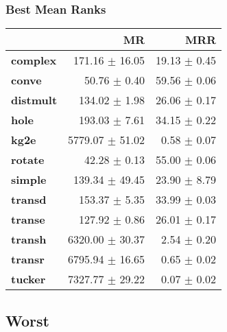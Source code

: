 \documentclass{article}
\begin{document}
    \subsubsection{Best Mean Ranks}
    \begin{center}
    \begin{tabular}{lrr}
\toprule
{} &               MR &           MRR \\
\midrule
\textbf{complex } &   171.16 $\pm$ 16.05 &  19.13 $\pm$ 0.45 \\
\textbf{conve   } &     50.76 $\pm$ 0.40 &  59.56 $\pm$ 0.06 \\
\textbf{distmult} &    134.02 $\pm$ 1.98 &  26.06 $\pm$ 0.17 \\
\textbf{hole    } &    193.03 $\pm$ 7.61 &  34.15 $\pm$ 0.22 \\
\textbf{kg2e    } &  5779.07 $\pm$ 51.02 &   0.58 $\pm$ 0.07 \\
\textbf{rotate  } &     42.28 $\pm$ 0.13 &  55.00 $\pm$ 0.06 \\
\textbf{simple  } &   139.34 $\pm$ 49.45 &  23.90 $\pm$ 8.79 \\
\textbf{transd  } &    153.37 $\pm$ 5.35 &  33.99 $\pm$ 0.03 \\
\textbf{transe  } &    127.92 $\pm$ 0.86 &  26.01 $\pm$ 0.17 \\
\textbf{transh  } &  6320.00 $\pm$ 30.37 &   2.54 $\pm$ 0.20 \\
\textbf{transr  } &  6795.94 $\pm$ 16.65 &   0.65 $\pm$ 0.02 \\
\textbf{tucker  } &  7327.77 $\pm$ 29.22 &   0.07 $\pm$ 0.02 \\
\bottomrule
\end{tabular}

    \end{center}
    \subsection{Worst}
\end{document}
